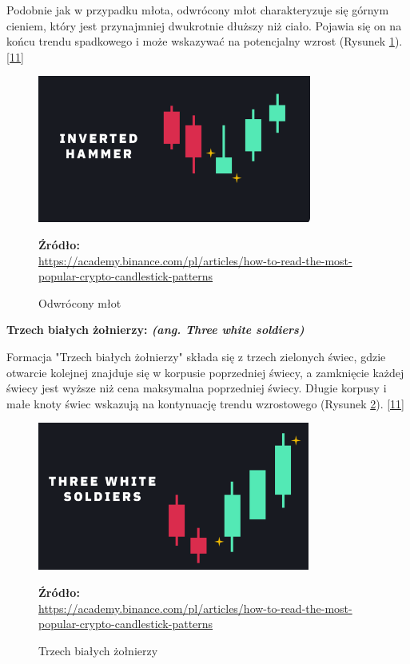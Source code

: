 \documentclass[12pt,a4paper,twoside, inzynierska]{pwr_wmat_praca_dyplomowa}
\theoremstyle{plain}
\numberwithin{theorem}{chapter}
\theoremstyle{definition}
\numberwithin{theorem}{chapter}
\begin{document}
	 Podobnie jak w przypadku młota, odwrócony młot charakteryzuje się górnym cieniem, który jest przynajmniej dwukrotnie dłuższy niż ciało. Pojawia się on na końcu trendu spadkowego i może wskazywać na potencjalny wzrost (Rysunek \ref{fig:ohammer}). \hyperref[info11]{[11]}
		\vspace{12pt}
	\begin{figure}[H]
		\centering
		\includegraphics[width=0.5 \textwidth]{ohammer.png}
		\caption{Odwrócony młot}
		\label{fig:ohammer}
		\textbf{Źródło:} \\
		\url{https://academy.binance.com/pl/articles/how-to-read-the-most-popular-crypto-candlestick-patterns}
	\end{figure}
	\vspace{12pt}
	
	\noindent \textbf{Trzech białych żołnierzy: \textit{(ang. Three white soldiers)}}
	
	Formacja "Trzech białych żołnierzy" składa się z trzech zielonych świec, gdzie otwarcie kolejnej znajduje się w korpusie poprzedniej świecy, a zamknięcie każdej świecy jest wyższe niż cena maksymalna poprzedniej świecy. Długie korpusy i małe knoty świec wskazują na kontynuację trendu wzrostowego (Rysunek \ref{fig:Trzech białych żołnierzy}). \hyperref[info11]{[11]}
		\vspace{12pt}
	\begin{figure}[H]
		\centering
		\includegraphics[width=0.5 \textwidth]{3zolnierzy.png}
		\caption{Trzech białych żołnierzy}
		\label{fig:Trzech białych żołnierzy}
		\textbf{Źródło:} \\
		\url{https://academy.binance.com/pl/articles/how-to-read-the-most-popular-crypto-candlestick-patterns}
	\end{figure}
	\vspace{12pt}
	
\end{document}
